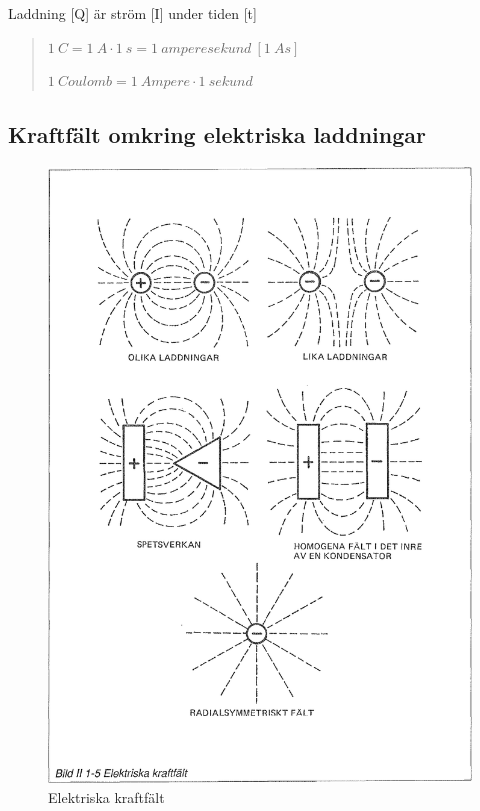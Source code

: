 Laddning [Q] är ström [I] under tiden [t]

\begin{quote}
\(1\ C = 1\ A \cdot 1\ s = 1\ amperesekund\ [1\ As]\)

\(1\ Coulomb = 1\ Ampere \cdot 1\ sekund\)
\end{quote}

\subsection{Kraftfält omkring elektriska laddningar}

\begin{figure}
\begin{center}
\includegraphics[width=14cm]{images/bild_2_1-05}
\caption{Elektriska kraftfält}
\label{fig:BildII1-5}
\end{center}
\end{figure}

